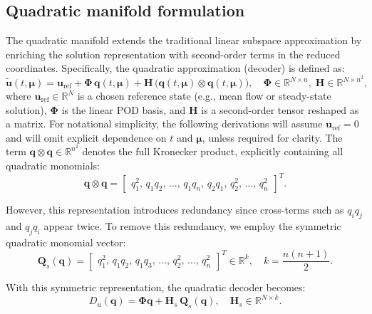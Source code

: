 \subsection{Quadratic manifold formulation}
\label{sec:quad_manifold_formulation}

The quadratic manifold extends the traditional linear subspace approximation by enriching the solution representation with second-order terms in the reduced coordinates. Specifically, the quadratic approximation (decoder) is defined as:
%
\begin{equation}
\tilde{\mathbf{u}}(t,\boldsymbol{\mu}) =
\mathbf{u}_{\text{ref}} +
\boldsymbol{\Phi}\,\mathbf{q}(t,\boldsymbol{\mu}) +
\mathbf{H}\,\bigl(\mathbf{q}(t,\boldsymbol{\mu})\otimes\mathbf{q}(t,\boldsymbol{\mu})\bigr),
\quad
\boldsymbol{\Phi}\in\mathbb{R}^{N\times n},\;
\mathbf{H}\in\mathbb{R}^{N\times n^{2}},
\label{eq:quad_decoder_full}
\end{equation}
%
where $\mathbf{u}_{\text{ref}}\in\mathbb{R}^{N}$ is a chosen reference state (e.g., mean flow or steady-state solution), 
$\boldsymbol{\Phi}$ is the linear POD basis, and $\mathbf{H}$ is a second-order tensor reshaped as a matrix. For notational simplicity, the following derivations will assume $\mathbf{u}_{\text{ref}}=0$ and will omit explicit dependence on $t$ and $\boldsymbol{\mu}$, unless required for clarity.
The term $\mathbf{q}\otimes\mathbf{q}\in\mathbb{R}^{n^{2}}$ denotes the full Kronecker product, explicitly containing all quadratic monomials:
%
\[
\mathbf{q}\otimes\mathbf{q}=
\begin{bmatrix}
q_1^2,\,q_1 q_2,\,\dots,\,q_1 q_n,\,
q_2 q_1,\,q_2^2,\,\dots,\,q_n^2
\end{bmatrix}^T.
\]

However, this representation introduces redundancy since cross-terms such as \(q_i q_j\) and \(q_j q_i\) appear twice. To remove this redundancy, we employ the symmetric quadratic monomial vector:
%
\begin{equation}
\mathbf{Q}_s(\mathbf{q}) =
\begin{bmatrix}
q_1^{2},\, q_1 q_2,\, q_1 q_3,\, \dots,\, q_2^2,\,\dots,\,q_n^{2}
\end{bmatrix}^{T}\in\mathbb{R}^{k}, \quad k=\frac{n(n+1)}{2}.
\label{eq:symmetric_monomials}
\end{equation}

With this symmetric representation, the quadratic decoder becomes:
%
\begin{equation}
D_u(\mathbf{q}) =
\boldsymbol{\Phi}\mathbf{q} +
\mathbf{H}_s\,\mathbf{Q}_s(\mathbf{q}),
\quad \mathbf{H}_s\in\mathbb{R}^{N\times k}.
\label{eq:quad_decoder_sym}
\end{equation}

